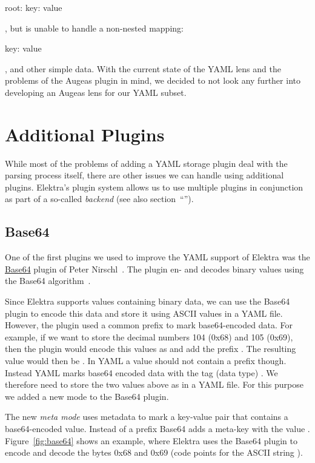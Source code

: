\begin{yamlcode}
  root:
    key: value
\end{yamlcode}

, but is unable to handle a non-nested mapping:

\begin{yamlcode}
  key: value
\end{yamlcode}

, and other simple data. With the current state of the YAML lens and the problems of the Augeas plugin in mind, we decided to not look any further into developing an Augeas lens for our YAML subset.

\section{Additional Plugins}

While most of the problems of adding a YAML storage plugin deal with the parsing process itself, there are other issues we can handle using additional plugins. Elektra’s plugin system allows us to use multiple plugins in conjunction as part of a so-called \emph{backend} (see also section~“”).

\subsection{Base64}
\label{sec:base64}

One of the first plugins we used to improve the YAML support of Elektra was the \href{https://www.libelektra.org/plugins/base64}{Base64} plugin of Peter Nirschl~\cite{nirschl2018crypto}. The plugin en- and decodes binary values using the Base64 algorithm~\cite{josefsson2006base16}.

Since Elektra supports values containing binary data, we can use the Base64 plugin to encode this data and store it using ASCII values in a YAML file. However, the plugin used a common prefix to mark base64-encoded data. For example, if we want to store the decimal numbers 104 (0x68) and 105 (0x69), then the plugin would encode this values as  and add the prefix . The resulting value would then be . In YAML a value should not contain a prefix though. Instead YAML marks base64 encoded data with the tag (data type) . We therefore need to store the two values above as  in a YAML file. For this purpose we added a new mode to the Base64 plugin.

The new \emph{meta mode} uses metadata to mark a key-value pair that contains a base64-encoded value. Instead of a prefix Base64 adds a meta-key  with the value . Figure~\ref{fig:base64} shows an example, where Elektra uses the Base64 plugin to encode and decode the bytes 0x68 and 0x69 (code points for the ASCII string ).

